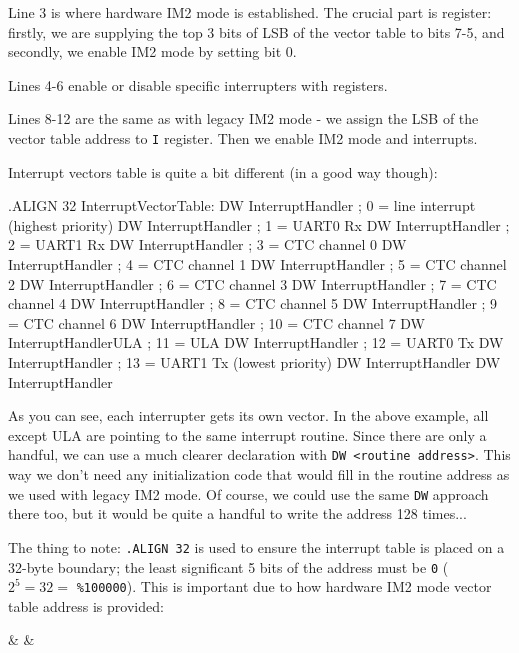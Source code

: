 Line 3 is where hardware IM2 mode is established. The crucial part is  register: firstly, we are supplying the top 3 bits of LSB of the vector table to bits 7-5, and secondly, we enable IM2 mode by setting bit 0.

Lines 4-6 enable or disable specific interrupters with  registers.

Lines 8-12 are the same as with legacy IM2 mode - we assign the LSB of the vector table address to {\tt I} register. Then we enable IM2 mode and interrupts.

Interrupt vectors table is quite a bit different (in a good way though):

\begin{tcblisting}{}
	.ALIGN 32
InterruptVectorTable:
	DW InterruptHandler        ; 0 = line interrupt (highest priority)
	DW InterruptHandler        ; 1 = UART0 Rx
	DW InterruptHandler        ; 2 = UART1 Rx
	DW InterruptHandler        ; 3 = CTC channel 0
	DW InterruptHandler        ; 4 = CTC channel 1
	DW InterruptHandler        ; 5 = CTC channel 2
	DW InterruptHandler        ; 6 = CTC channel 3
	DW InterruptHandler        ; 7 = CTC channel 4
	DW InterruptHandler        ; 8 = CTC channel 5
	DW InterruptHandler        ; 9 = CTC channel 6
	DW InterruptHandler        ; 10 = CTC channel 7
	DW InterruptHandlerULA     ; 11 = ULA
	DW InterruptHandler        ; 12 = UART0 Tx
	DW InterruptHandler        ; 13 = UART1 Tx (lowest priority)
	DW InterruptHandler
	DW InterruptHandler
\end{tcblisting}

As you can see, each interrupter gets its own vector. In the above example, all except ULA are pointing to the same interrupt routine. Since there are only a handful, we can use a much clearer declaration with {\tt DW <routine address>}. This way we don't need any initialization code that would fill in the routine address as we used with legacy IM2 mode. Of course, we could use the same {\tt DW} approach there too, but it would be quite a handful to write the address 128 times...

The thing to note: {\tt .ALIGN 32} is used to ensure the interrupt table is placed on a 32-byte boundary; the least significant 5 bits of the address must be {\tt 0} ($2^5=32=$ {\tt \%100000}). This is important due to how hardware IM2 mode vector table address is provided:

\begin{BitTableWord}
	 &  &  \\
\end{BitTableWord}

